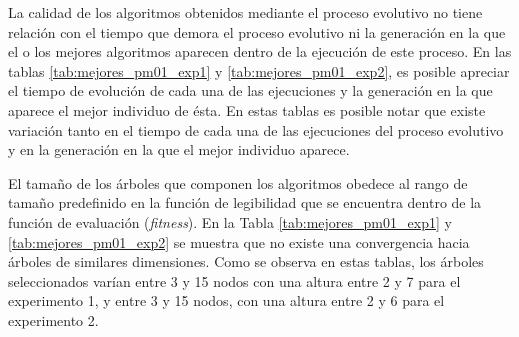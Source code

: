 La calidad de los algoritmos obtenidos mediante el proceso evolutivo no tiene relación con el tiempo que demora el proceso evolutivo ni la generación en la que el o los mejores algoritmos aparecen dentro de la ejecución de este proceso. En las tablas \ref{tab:mejores_pm01_exp1} y \ref{tab:mejores_pm01_exp2}, es posible apreciar el tiempo de evolución de cada una de las ejecuciones y la generación en la que aparece el mejor individuo de ésta. En estas tablas es posible notar que existe variación tanto en el tiempo de cada una de las ejecuciones del proceso evolutivo y en la generación en la que el mejor individuo aparece.

El tamaño de los árboles que componen los algoritmos obedece al rango de tamaño predefinido en la función de legibilidad que se encuentra dentro de la función de evaluación (\textit{fitness}). En la Tabla \ref{tab:mejores_pm01_exp1} y \ref{tab:mejores_pm01_exp2} se muestra que no existe una convergencia hacia árboles de similares dimensiones. Como se observa en estas tablas, los árboles seleccionados varían entre 3 y 15 nodos con una altura entre 2 y 7 para el experimento 1, y entre 3 y 15 nodos, con una altura entre 2 y 6 para el experimento 2.

